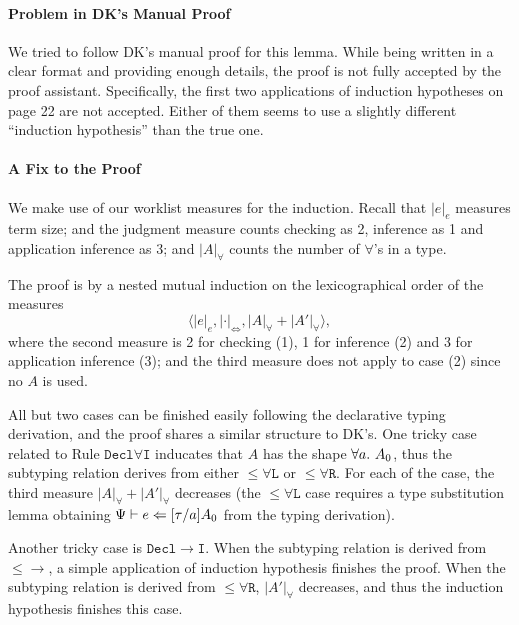 \paragraph{Problem in DK's Manual Proof}
We tried to follow DK's manual proof for this lemma.
While being written in a clear format and providing enough details,
the proof is not fully accepted by the proof assistant.
Specifically, the first two applications of induction hypotheses on page 22 are not accepted.
Either of them seems to use a slightly different ``induction hypothesis'' than the true one.

\paragraph{A Fix to the Proof}
We make use of our worklist measures for the induction.
Recall that $|e|_e$ measures term size;
and the judgment measure counts checking as 2, inference as 1 and application inference as 3;
and $|A|_\forall$ counts the number of $\forall$'s in a type.

The proof is by a nested mutual induction on the lexicographical order of the measures
$$\langle |e|_e, |\cdot|_\Leftrightarrow, |A|_\forall + |A'|_\forall \rangle,$$
where the second measure is 2 for checking (1), 1 for inference (2) and 3 for application inference (3);
and the third measure does not apply to case (2) since no $A$ is used.

All but two cases can be finished easily following the declarative typing derivation,
and the proof shares a similar structure to DK's.
One tricky case related to Rule $\mathtt{Decl\forall I}$ inducates that $A$ has the shape $\all A_0$,
thus the subtyping relation derives from either $\mathtt{{\le}\forall L}$ or $\mathtt{{\le}\forall R}$.
For each of the case, the third measure $|A|_\forall + |A'|_\forall$ decreases
(the $\mathtt{{\le}\forall L}$ case requires a type substitution lemma obtaining
$\Psi \vdash e \Leftarrow [\tau/a]A_0$ from the typing derivation).

Another tricky case is $\mathtt{Decl{\to}I}$.
When the subtyping relation is derived from $\mathtt{{\le}{\to}}$,
a simple application of induction hypothesis finishes the proof.
When the subtyping relation is derived from $\mathtt{{\le}\forall R}$,
$|A'|_\forall$ decreases, and thus the induction hypothesis finishes this case.
